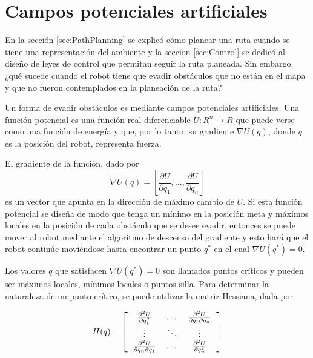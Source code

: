 \documentclass[a4paper]{article}
\begin{document}
\section{Campos potenciales artificiales}
En la sección \ref{sec:PathPlanning} se explicó cómo planear una ruta cuando se tiene una representación del ambiente y la seccion \ref{sec:Control} se dedicó al diseño de leyes de control que permitan seguir la ruta planeada. Sin embargo, ¿qué sucede cuando el robot tiene que evadir obstáculos que no están en el mapa y que no fueron contemplados en la planeación de la ruta? 

Un forma de evadir obstáculos es mediante campos potenciales artificiales. Una función potencial es una función real diferenciable $U: R^n \rightarrow R$ que puede verse como una función de energía y que, por lo tanto, su gradiente $\nabla U(q)$, donde $q$ es la posición del robot, representa fuerza. 

El gradiente de la función, dado por
\begin{equation}
  \label{eq:PotentialGradient}
  \nabla U(q) = \left[\frac{\partial U}{\partial q_1},\dots,\frac{\partial U}{\partial q_n}\right]
\end{equation}
es un vector que apunta en la dirección de máximo cambio de $U$. Si esta función potencial se diseña de modo que tenga un mínimo en la posición meta y máximos locales en la posición de cada obstáculo que se desee evadir, entonces se puede mover al robot mediante el algoritmo de descenso del gradiente y esto hará que el robot continúe moviéndose hasta encontrar un punto $q^*$ en el cual $\nabla U(q^*) = 0$. 

Los valores $q$ que satisfacen $\nabla U(q^*) = 0$ son llamados puntos críticos y pueden ser máximos locales, mínimos locales o puntos silla. Para determinar la naturaleza de un punto crítico, se puede utilizar la matriz Hessiana, dada por

\begin{equation}
  \label{eq:Hessian}
  H(q) = \left[
    \begin{tabular}{ccc}
      $\frac{\partial^2 U}{\partial q_1^2}$ &$ \dots$ &$ \frac{\partial^2 U}{\partial q_1 \partial q_n}$\\
      $\vdots$ & $\ddots$ & $\vdots$ \\
      $\frac{\partial^2 U}{\partial q_n\partial q_1}$ &$ \dots$ &$ \frac{\partial^2 U}{\partial q_n^2}$
    \end{tabular}
\right]
\end{equation}
\end{document}
